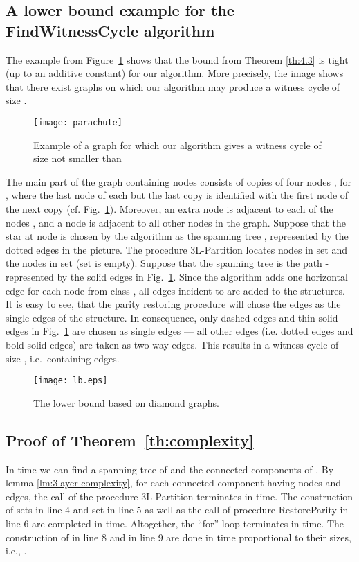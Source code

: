 \documentclass[11pt,envcountsame,oribibl]{llncs}
\begin{document}
\subsection{A lower bound example for the {\sc FindWitnessCycle} algorithm}
The example from Figure~\ref{fig:parachute} shows that the bound from
Theorem \ref{th:4.3} is tight (up to an additive constant) for our algorithm.
More precisely, the image shows that there exist graphs on which our algorithm
may produce a witness cycle of size .
\begin{figure}[!htb]
  \begin{center}
\texttt{[image: parachute]}
\end{center}
  \caption{Example of a graph for which our algorithm
           gives a witness cycle of size not smaller than
           }
  \label{fig:parachute}
\end{figure}
The main part of the graph containing  nodes consists of  copies
of four nodes
, for , where the last node of
each but the last copy is identified with the first node of the next copy
(cf. Fig.~\ref{fig:parachute}). Moreover, an extra node  is
adjacent to each of the nodes ,
and a node  is adjacent to all other nodes in the graph.
Suppose that the star at node  is chosen by the algorithm
as the spanning tree , represented by the dotted edges in the
picture. The procedure {\sc 3L-Partition}  locates nodes
 in set  and
the nodes 
in set  (set  is empty). Suppose that the spanning tree is the
path  - represented by the solid edges in
Fig.~\ref{fig:parachute}. Since the algorithm adds one horizontal
edge for each node from class , all edges incident to 
are added to the structures. It is easy to see, that the parity
restoring procedure will chose the edges  as the single
edges of the structure. In consequence, only  dashed edges and  thin
solid edges in Fig.~\ref{fig:parachute} are chosen as single
edges --- all other edges (i.e.  dotted edges and
 bold solid edges) are taken as two-way edges. This results in
a witness cycle of size , i.e.\ containing
 edges.


\begin{figure}[htbp] \centering
   \texttt{[image: lb.eps]}
   \caption{The lower bound based on diamond graphs.}
   \label{fig:lb}
\end{figure}


\subsection{Proof of Theorem~\ref{th:complexity}}
In  time we can find a spanning tree  of  and the connected
components of . By lemma \ref{lm:3layer-complexity}, for each
connected component  having  nodes and  edges, the call of
the procedure {\sc 3L-Partition}  terminates in  time. The construction
of sets  in line 4 and set  in line 5 as well as the call of procedure
{\sc RestoreParity} in line 6 are completed in  time.
Altogether, the ``for'' loop terminates in  time. The construction
of  in line 8 and  in line 9 are done
in time proportional to their sizes, i.e., .
\end{document}
